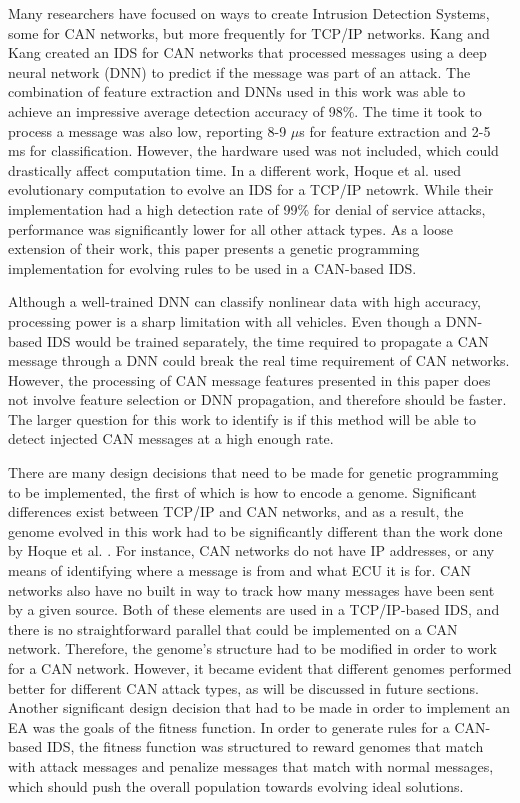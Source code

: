 \documentclass[10pt,conference]{IEEEtran}
\begin{document}
Many researchers have focused on ways to create Intrusion Detection Systems, some for CAN networks, but more frequently for TCP/IP networks.  Kang and Kang created an IDS for CAN networks that processed messages using a deep neural network (DNN) to predict if the message was part of an attack\cite{kang2016intrusion}.  The combination of feature extraction and DNNs used in this work was able to achieve an impressive average detection accuracy of 98\%.  The time it took to process a message was also low, reporting 8-9 $\mu$s for feature extraction and 2-5 ms for classification.  However, the hardware used was not included, which could drastically affect computation time.  In a different work, Hoque et al. used evolutionary computation to evolve an IDS for a TCP/IP netowrk\cite{hoque2012implementation}.  While their implementation had a high detection rate of 99\% for denial of service attacks, performance was significantly lower for all other attack types.  As a loose extension of their work, this paper presents a genetic programming implementation for evolving rules to be used in a CAN-based IDS.  

Although a well-trained DNN can classify nonlinear data with high accuracy, processing power is a sharp limitation with all vehicles.  Even though a DNN-based IDS would be trained separately, the time required to propagate a CAN message through a DNN could break the real time requirement of CAN networks.  However, the processing of CAN message features presented in this paper does not involve feature selection or DNN propagation, and therefore should be faster.  The larger question for this work to identify is if this method will be able to detect injected CAN messages at a high enough rate.

There are many design decisions that need to be made for genetic programming to be implemented, the first of which is how to encode a genome.  Significant differences exist between TCP/IP and CAN networks, and as a result, the genome evolved in this work had to be significantly different than the work done by Hoque et al. \cite{hoque2012implementation}.  For instance, CAN networks do not have IP addresses, or any means of identifying where a message is from and what ECU it is for.  CAN networks also have no built in way to track how many messages have been sent by a given source.  Both of these elements are used in a TCP/IP-based IDS, and there is no straightforward parallel that could be implemented on a CAN network.  Therefore, the genome's structure had to be modified in order to work for a CAN network.  However, it became evident that different genomes performed better for different CAN attack types, as will be discussed in future sections.  Another significant design decision that had to be made in order to implement an EA was the goals of the fitness function.  In order to generate rules for a CAN-based IDS, the fitness function was structured to reward genomes that match with attack messages and penalize messages that match with normal messages, which should push the overall population towards evolving ideal solutions.  
\end{document}
